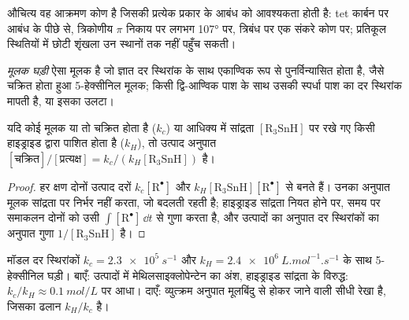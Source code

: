 औचित्य वह आक्रमण कोण है जिसकी प्रत्येक प्रकार के आबंध को आवश्यकता होती है: tet कार्बन पर
आबंध के पीछे से, त्रिकोणीय $\pi$ निकाय पर लगभग 107° पर, त्रिबंध पर एक संकरे
कोण पर; प्रतिकूल स्थितियों में छोटी शृंखला उन स्थानों तक नहीं पहुँच सकती।

\begin{definition}[मूलक घड़ी]\label{def:b3:radicals-carbenes:radical-clock}
\emph{मूलक घड़ी} ऐसा मूलक है जो ज्ञात दर स्थिरांक के साथ
एकाण्विक रूप से पुनर्विन्यासित होता है, जैसे चक्रित होता हुआ 5-हेक्सीनिल मूलक;
किसी द्वि-आण्विक पाश के साथ उसकी स्पर्धा पाश का दर स्थिरांक मापती है,
या इसका उलटा।
\end{definition}

\begin{proposition}[स्पर्धा बलगतिकी]\label{prop:b3:radicals-carbenes:clock}
यदि कोई मूलक या तो चक्रित होता है ($k_c$) या आधिक्य में
सांद्रता $[\mathrm{R_3SnH}]$ पर रखे गए किसी हाइड्राइड द्वारा पाशित होता है ($k_H$), तो उत्पाद अनुपात
$[\text{चक्रित}]/[\text{प्रत्यक्ष}] = k_c/(k_H[\mathrm{R_3SnH}])$ है।
\end{proposition}

\begin{proof}
हर क्षण दोनों उत्पाद दरों $k_c[\mathrm R^\bullet]$ और $k_H[\mathrm{R_3SnH}][\mathrm R^\bullet]$ से बनते हैं। उनका अनुपात
मूलक सांद्रता पर निर्भर नहीं करता, जो बदलती रहती है; हाइड्राइड
सांद्रता नियत होने पर, समय पर समाकलन दोनों को उसी
$\int[\mathrm R^\bullet]\,\dd t$ से गुणा करता है, और उत्पादों का अनुपात दर स्थिरांकों का अनुपात
गुणा $1/[\mathrm{R_3SnH}]$ है।
\end{proof}

\begin{omfigure}

{\small मॉडल दर स्थिरांकों $k_c = \qty{2.3e5}{s^{-1}}$ और
$k_H = \qty{2.4e6}{L.mol^{-1}.s^{-1}}$ के साथ 5-हेक्सीनिल घड़ी। बाएँ: उत्पादों में मेथिलसाइक्लोपेन्टेन का अंश,
हाइड्राइड सांद्रता के विरुद्ध: $k_c/k_H \approx \qty{0.1}{mol/L}$ पर आधा। दाएँ: व्युत्क्रम अनुपात मूलबिंदु से होकर जाने वाली
सीधी रेखा है, जिसका ढलान $k_H/k_c$ है।}
\end{omfigure}

